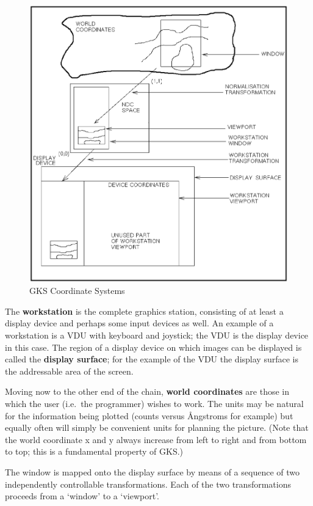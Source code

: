 \documentclass[11pt]{article}
\begin{document}
\begin{figure}
   \includegraphics[scale=.8]{sun85_diag1.eps}
   \caption{GKS Coordinate Systems}
\end{figure}

The {\bf workstation} is the complete
graphics station,
consisting of at least a display device and perhaps some input
devices as well.  An example of a workstation is a VDU with keyboard
and joystick;  the VDU is the display device in this case.  The
region of a display device on which images can be displayed
is called the {\bf display surface};  for
the example of the VDU the display surface is the addressable
area of the screen.

Moving now to the other end of the chain,
{\bf world coordinates} are those in which the user (i.e.\ the
programmer) wishes to work.  The units may be natural
for the information being plotted (counts versus \AA ngstroms
for example)
but equally often will simply be convenient units
for planning the picture.  (Note that the world coordinate x and y
always increase from left to right and from bottom to top;  this is a
fundamental property of GKS.)

The window is mapped onto the display surface by means of
a sequence of two independently
controllable transformations.  Each of the
two transformations proceeds from a `window'
to a `viewport'.
\end{document}
